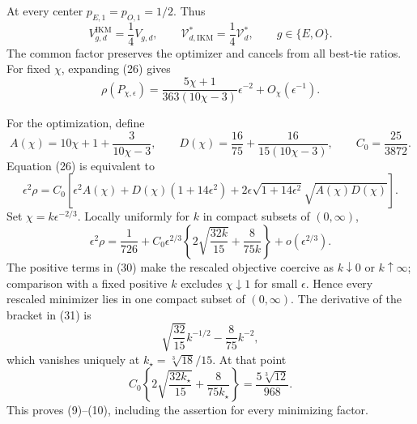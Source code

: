 At every center \(p_{E,1}=p_{O,1}=1/2\).  Thus
\[
 V_{g,d}^{\mathrm{IKM}}=\frac14V_{g,d},
 \qquad
 \mathcal V_{d,\mathrm{IKM}}^*=\frac14\mathcal V_d^*,
 \qquad g\in\{E,O\}.                                     \tag{28}
\]
The common factor preserves the optimizer and cancels from all best-tie ratios.  For fixed \(\chi\), expanding (26) gives
\[
 \rho(P_{\chi,\epsilon})
 =\frac{5\chi+1}{363(10\chi-3)}\epsilon^{-2}
 +O_\chi(\epsilon^{-1}).                                  \tag{29}
\]

For the optimization, define
\[
 A(\chi)=10\chi+1+\frac3{10\chi-3},
 \qquad
 D(\chi)=\frac{16}{75}+\frac{16}{15(10\chi-3)},
 \qquad C_0=\frac{25}{3872}.
\]
Equation (26) is equivalent to
\[
 \epsilon^2\rho=C_0\left[
 \epsilon^2A(\chi)+D(\chi)(1+14\epsilon^2)
 +2\epsilon\sqrt{1+14\epsilon^2}\sqrt{A(\chi)D(\chi)}
 \right].                                                  \tag{30}
\]
Set \(\chi=k\epsilon^{-2/3}\).  Locally uniformly for \(k\) in compact subsets of \((0,\infty)\),
\[
 \epsilon^2\rho
 =\frac1{726}+C_0\epsilon^{2/3}
 \left\{2\sqrt{\frac{32k}{15}}+\frac8{75k}\right\}
 +o(\epsilon^{2/3}).                                      \tag{31}
\]
The positive terms in (30) make the rescaled objective coercive as \(k\downarrow0\) or \(k\uparrow\infty\); comparison with a fixed positive \(k\) excludes \(\chi\downarrow1\) for small \(\epsilon\).  Hence every rescaled minimizer lies in one compact subset of \((0,\infty)\).  The derivative of the bracket in (31) is
\[
 \sqrt{\frac{32}{15}}k^{-1/2}-\frac8{75}k^{-2},
\]
which vanishes uniquely at \(k_\star=\sqrt[3]{18}/15\).  At that point
\[
 C_0\left\{2\sqrt{\frac{32k_\star}{15}}+\frac8{75k_\star}\right\}
 =\frac{5\sqrt[3]{12}}{968}.
\]
This proves (9)--(10), including the assertion for every minimizing factor.